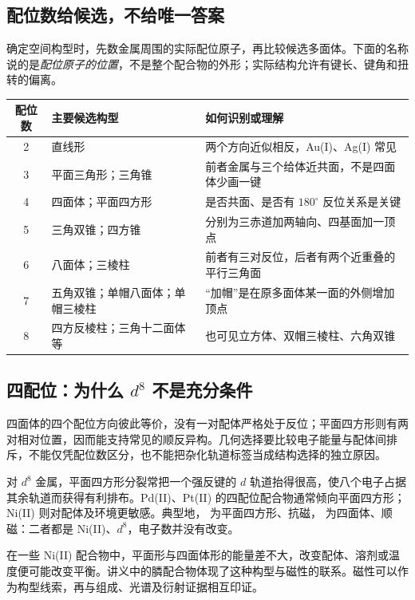 \subsection{配位数给候选，不给唯一答案}
确定空间构型时，先数金属周围的实际配位原子，再比较候选多面体。下面的名称说的是\emph{配位原子的位置}，不是整个配合物的外形；实际结构允许有键长、键角和扭转的偏离。

\begin{center}
\small
\begin{tabularx}{\linewidth}{@{}c l X@{}}
\toprule
配位数 & 主要候选构型 & 如何识别或理解 \\
\midrule
2 & 直线形 & 两个方向近似相反，Au(I)、Ag(I) 常见 \\
3 & 平面三角形；三角锥 & 前者金属与三个给体近共面，不是四面体少画一键 \\
4 & 四面体；平面四方形 & 是否共面、是否有 $180^\circ$ 反位关系是关键 \\
5 & 三角双锥；四方锥 & 分别为三赤道加两轴向、四基面加一顶点 \\
6 & 八面体；三棱柱 & 前者有三对反位，后者有两个近重叠的平行三角面 \\
7 & 五角双锥；单帽八面体；单帽三棱柱 & “加帽”是在原多面体某一面的外侧增加顶点 \\
8 & 四方反棱柱；三角十二面体等 & 也可见立方体、双帽三棱柱、六角双锥 \\
\bottomrule
\end{tabularx}
\end{center}

\subsection{四配位：为什么 $d^8$ 不是充分条件}
四面体的四个配位方向彼此等价，没有一对配体严格处于反位；平面四方形则有两对相对位置，因而能支持常见的顺反异构。几何选择要比较电子能量与配体间排斥，不能仅凭配位数区分，也不能把杂化轨道标签当成结构选择的独立原因。

对 $d^8$ 金属，平面四方形分裂常把一个强反键的 $d$ 轨道抬得很高，使八个电子占据其余轨道而获得有利排布。Pd(II)、Pt(II) 的四配位配合物通常倾向平面四方形；Ni(II) 则对配体及环境更敏感。典型地， 为平面四方形、抗磁， 为四面体、顺磁：二者都是 Ni(II)、$d^8$，电子数并没有改变。

在一些 Ni(II) 配合物中，平面形与四面体形的能量差不大，改变配体、溶剂或温度便可能改变平衡。讲义中的膦配合物体现了这种构型与磁性的联系。磁性可以作为构型线索，再与组成、光谱及衍射证据相互印证。

